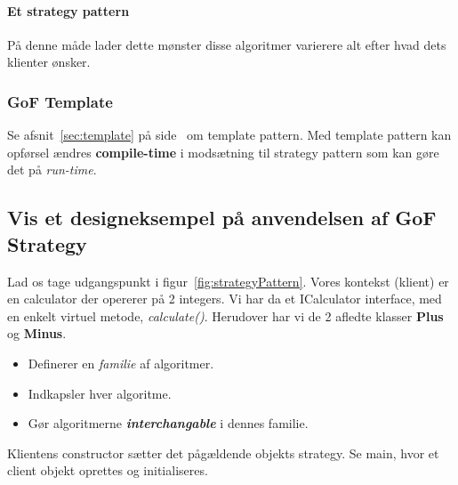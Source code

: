 \paragraph{Et strategy pattern}

På denne måde lader dette mønster disse algoritmer varierere alt efter hvad dets klienter ønsker.

\subsubsection{GoF Template}
Se afsnit~\ref{sec:template} på side~\pageref{sec:template} om template pattern. Med template pattern kan opførsel ændres \textbf{compile-time} i modsætning til strategy pattern som kan gøre det på \textit{run-time}.

\subsection{Vis et designeksempel på anvendelsen af GoF Strategy}

Lad os tage udgangspunkt i figur~\ref{fig:strategyPattern}. Vores kontekst (klient) er en calculator der opererer på 2 integers.
Vi har da et ICalculator interface, med en enkelt virtuel metode, \textit{calculate()}.
Herudover har vi de 2 afledte klasser \textbf{Plus} og \textbf{Minus}.

\begin{itemize}
	\item Definerer en \textit{familie} af algoritmer.
	\item Indkapsler hver algoritme.
	\item Gør algoritmerne \textbf{\textit{interchangable}} i dennes familie.
\end{itemize}

Klientens constructor sætter det pågældende objekts strategy. Se main, hvor et client objekt oprettes og initialiseres.

